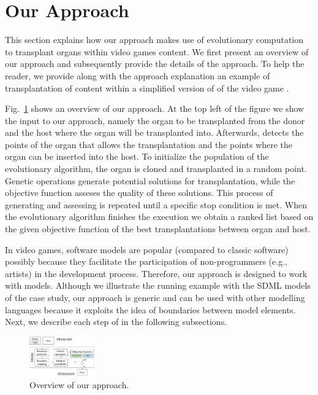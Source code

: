 \section{Our \ApproachName{} Approach} 
\label{sec:Approach}

This section explains how our \ApproachName{} approach makes use of evolutionary computation to transplant organs within video games content. We first present an overview of our approach and subsequently provide the details of the approach. To help the reader, we provide along with the approach explanation an example of transplantation of content within a simplified version of  of the video game \CaseStudy{}.

Fig.~\ref{fig:approach} shows an overview of our approach.
At the top left of the figure we show the input to our approach, namely the organ to be transplanted from the donor and the host where the organ will be transplanted into. Afterwards, \ApproachName{} detects the points of the organ that allows the transplantation and the points where the organ can be inserted into the host. To initialize the population of the evolutionary algorithm, the organ is cloned and transplanted in a random point. Genetic operations generate potential solutions for transplantation, while the objective function asseses the quality of these solutions. This process of generating and assessing is repeated until a specific stop condition is met. When the evolutionary algorithm finishes the execution we obtain a ranked list based on the given objective function of the best transplantations between organ and host.

In video games, software models are popular (compared to classic software) possibly because they facilitate the participation of non-programmers (e.g., artists) in the development process. Therefore, our \ApproachName{} approach is designed to work with models. Although we illustrate the running example with the SDML models of the case study, our approach is generic and can be used with other modelling languages because it exploits the idea of boundaries between model elements.
Next, we describe each step of \ApproachName{} in the following subsections.

\begin{figure}[tb]
    \centering
    \includegraphics[width=0.25\textwidth]{Figures/overview.png}
    \caption{Overview of our \ApproachName{} approach.}
    \label{fig:approach}
\end{figure}


